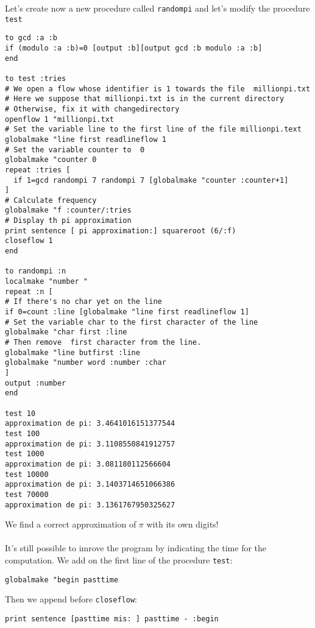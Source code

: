 Let's create now a new procedure called \texttt{randompi} and let's modify the procedure \texttt{test}
\begin{verbatim}
to gcd :a :b
if (modulo :a :b)=0 [output :b][output gcd :b modulo :a :b] 
end

to test :tries
# We open a flow whose identifier is 1 towards the file  millionpi.txt
# Here we suppose that millionpi.txt is in the current directory
# Otherwise, fix it with changedirectory
openflow 1 "millionpi.txt
# Set the variable line to the first line of the file millionpi.text
globalmake "line first readlineflow 1
# Set the variable counter to  0
globalmake "counter 0
repeat :tries [
  if 1=gcd randompi 7 randompi 7 [globalmake "counter :counter+1]
]
# Calculate frequency
globalmake "f :counter/:tries
# Display th pi approximation
print sentence [ pi approximation:] squareroot (6/:f)
closeflow 1
end

to randompi :n
localmake "number "
repeat :n [
# If there's no char yet on the line
if 0=count :line [globalmake "line first readlineflow 1]
# Set the variable char to the first character of the line
globalmake "char first :line
# Then remove  first character from the line.
globalmake "line butfirst :line
globalmake "number word :number :char
]
output :number
end

test 10
approximation de pi: 3.4641016151377544 
test 100
approximation de pi: 3.1108550841912757 
test 1000
approximation de pi: 3.081180112566604 
test 10000
approximation de pi: 3.1403714651066386 
test 70000
approximation de pi: 3.1361767950325627
\end{verbatim}
We find a correct approximation of $\pi$ with its own digits!\\ \\
It's still possible to imrove the program by indicating the time for the computation. We add on the first line of the procedure \texttt{test}:
\begin{center}
\texttt{globalmake "begin pasttime}
\end{center}
Then we append before \texttt{closeflow}:
\begin{center}
\texttt{print sentence [pasttime mis: ] pasttime - :begin}
\end{center}
